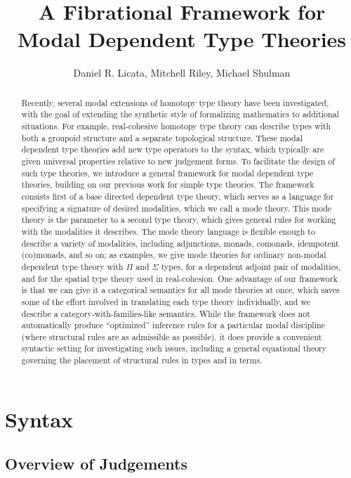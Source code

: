 \documentclass[10pt]{article}
\title{A Fibrational Framework for Modal Dependent Type Theories}
\author{Daniel R. Licata, Mitchell Riley, Michael Shulman}
\date{}
\theoremstyle{definition}
\begin{document}
\maketitle
\tableofcontents

\begin{abstract}
Recently, several modal extensions of homotopy type theory have been
investigated, with the goal of extending the synthetic style of
formalizing mathematics to additional situations.  For example,
real-cohesive homotopy type theory can describe types with both a
groupoid structure and a separate topological structure.  These modal
dependent type theories add new type operators to the syntax, which
typically are given universal properties relative to new judgement
forms.  To facilitate the design of such type theories, we introduce a
general framework for modal dependent type theories, building on our
previous work for simple type theories.  The framework consists first of
a base directed dependent type theory, which serves as a language for
specifying a signature of desired modalities, which we call a mode
theory.  This mode theory is the parameter to a second type theory,
which gives general rules for working with the modalities it describes.
The mode theory language is flexible enough to describe a variety of
modalities, including adjunctions, monads, comonads, idempotent
(co)monads, and so on; as examples, we give mode theories for ordinary
non-modal dependent type theory with $\Pi$ and $\Sigma$ types, for a
dependent adjoint pair of modalities, and for the spatial type theory
used in real-cohesion.  One advantage of our framework is that we can
give it a categorical semantics for all mode theories at once, which
saves some of the effort involved in translating each type theory
individually, and we describe a category-with-families-like semantics.
While the framework does not automatically produce ``optimized''
inference rules for a particular modal discipline (where structural
rules are as admissible as possible), it does provide a convenient
syntactic setting for investigating such issues, including a general
equational theory governing the placement of structural rules in types
and in terms.
\end{abstract}

\section{Syntax}

\subsection{Overview of Judgements}
\end{document}
